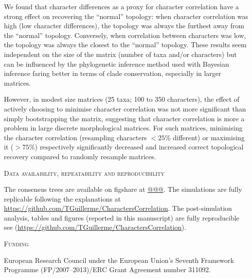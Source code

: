 \documentclass[12pt,letterpaper]{article}
\renewcommand{\section}[1]{%
\bigskip
\begin{center}
\begin{Large}
\normalfont\scshape #1
\medskip
\end{Large}
\end{center}}
\begin{document}
We found that character differences as a proxy for character correlation have a strong effect on recovering the ``normal'' topology: when character correlation was high (low character differences), the topology was always the furthest away from the ``normal'' topology.
Conversely, when correlation between characters was low, the topology was always the closest to the ``normal'' topology.
These results seem independent on the size of the matrix (number of taxa and/or characters) but can be influenced by the phylogenetic inference method used with Bayesian inference faring better in terms of clade conservation, especially in larger matrices.

However, in modest size matrices (25 taxa; 100 to 350 characters), the effect of actively choosing to minimise character correlation was not more significant than simply bootstrapping the matrix, suggesting that character correlation is more a problem in large discrete morphological matrices.
For such matrices, minimising the character correlation (resampling characters $<25$\% different) or maximising it ($>75$\%) respectively significantly decreased and increased correct topological recovery compared to randomly resample matrices.










\section{Data availability, repeatability and reproducibility}
The consensus trees are available on figshare at \url{@@@}.
The simulations are fully replicable following the explanations at \url{https://github.com/TGuillerme/CharactersCorrelation}.
The post-simulation analysis, tables and figures (reported in this manuscript) are fully reproducible see (\url{https://github.com/TGuillerme/CharactersCorrelation}).

\section{Funding}
European Research Council under the European Union’s Seventh Framework Programme (FP/2007–2013)/ERC Grant Agreement number 311092.
\end{document}
